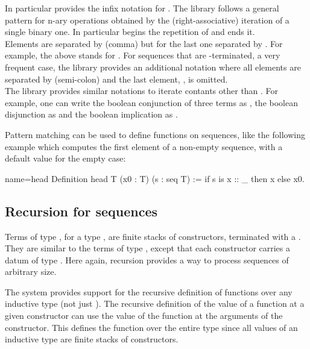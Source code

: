 In particular \Coq{} provides the infix notation \C{::} for
.  The \mcbMC{} library follows a general pattern for
n-ary operations obtained by the (right-associative)
iteration of a single binary one. In
particular \C{[::} begins the repetition
of \C{::} and \C{]} ends it.\\
Elements are separated by \C{,} (comma)
but for the last one separated by \C{&}.
For example, the above \C{[:: 1, 2, 3 & l]} stands for
.
For sequences that are -terminated, a very frequent case,
the \mcbMC{} library provides an additional notation where all elements are
separated by \C{;} (semi-colon) and the last element, ,
is omitted.
\index[coq]{\C{[seq .. ; ..]}}\\
The \mcbMC{} library provides similar notations 
to iterate contants other than .
For example, one can write  the boolean conjunction
of three terms as , the 
boolean disjunction as \C{[|| b1, b2 | b3]} and the boolean
implication as \C{[==> b1, b2 => b3]}.
\index[coq]{\C{["|"| .. , .. "| ..]}}
\index[coq]{\C{[&& .. , .. & ..]}}
\index[coq]{\C{[==> .. , .. => ..]}}

Pattern matching can be used to define functions on sequences, like
the following example which computes the first element of a non-empty
sequence, with a default value for the empty case:

\begin{coq}{name=head}{}
Definition head T (x0 : T) (s : seq T) := if s is x :: _ then x else x0.
\end{coq}

\subsection{Recursion for sequences}

Terms of type , for a type , are finite stacks of
 constructors, terminated with a . They are similar to
the terms of type , except that each  constructor
carries a datum of type . Here again, recursion provides a way
to process sequences of arbitrary size.


The \Coq{} system provides support for the recursive definition of
functions over any inductive type (not just ). The recursive
definition of the value of a
function at a given constructor can use the value of the function at
the arguments of the constructor. This defines the function over the
entire type since all values of an inductive type are finite stacks of
constructors.

